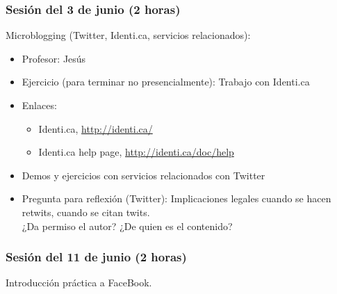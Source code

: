 \documentclass[a4paper,12pt]{article}
\begin{document}
\subsubsection{Sesión del 3 de junio (2 horas)}

Microblogging (Twitter, Identi.ca, servicios relacionados):

\begin{itemize}
\item Profesor: Jesús
\item Ejercicio (para terminar no presencialmente): Trabajo con Identi.ca
\item Enlaces:
  \begin{itemize}
  \item Identi.ca, \url{http://identi.ca/}
  \item Identi.ca help page, \url{http://identi.ca/doc/help}
  \end{itemize}
\item Demos y ejercicios con servicios relacionados con Twitter
\item Pregunta para reflexión (Twitter): Implicaciones legales cuando se hacen retwits, cuando se citan twits. \\
  ¿Da permiso el autor? ¿De quien es el contenido?
\end{itemize}

\subsubsection{Sesión del 11 de junio (2 horas)}

Introducción práctica a FaceBook.

\end{document}
